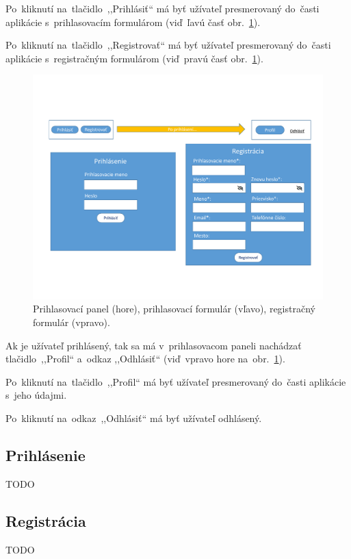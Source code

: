 Po~kliknutí na~tlačidlo~,,Prihlásiť`` má byť užívateľ presmerovaný do~časti aplikácie s~prihlasovacím formulárom (viď~ľavú časť obr.~\ref{auth}).

Po~kliknutí na~tlačidlo~,,Registrovať`` má byť užívateľ presmerovaný do~časti aplikácie s~registračným formulárom (viď~pravú časť obr.~\ref{auth}).

\begin{figure}[H]\centering
\includegraphics[width=140mm]{../img/UI concept/auth}
\caption{Prihlasovací panel (hore), prihlasovací formulár (vľavo), registračný formulár (vpravo).}
\label{auth}
\end{figure}

Ak je užívateľ prihlásený, tak sa má v~prihlasovacom paneli nachádzať tlačidlo~,,Profil`` a~odkaz ,,Odhlásiť`` (viď~vpravo hore na~obr.~\ref{auth}).

Po~kliknutí na~tlačidlo~,,Profil`` má byť užívateľ presmerovaný do~časti aplikácie s~jeho údajmi.

Po~kliknutí na~odkaz~,,Odhlásiť`` má byť užívateľ odhlásený.

\subsection{Prihlásenie}

TODO

\subsection{Registrácia}

TODO

